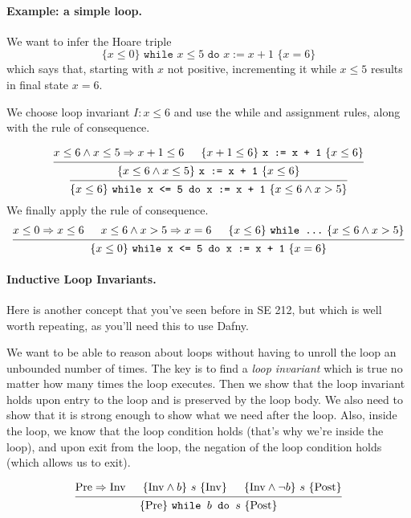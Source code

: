 \documentclass[11pt]{article}
\begin{document}
\paragraph{Example: a simple loop.}
We want to infer the Hoare triple
\[ \{ x \leq 0 \} \texttt{~while $x \leq 5$ do $x := x + 1$~}  \{ x=6\} \]
which says that, starting with $x$ not positive, incrementing it while $x \leq 5$ results in final state $x = 6$.

We choose loop invariant $I: x \leq 6$ and use the while and assignment rules, along with the rule of consequence.

\[
\begin{prooftree}
  \hypo{x \leq 6 \wedge x \leq 5 \Rightarrow x + 1 \leq 6}
  \hypo{\{ x+1 \leq 6 \} ~\texttt{x := x + 1}~ \{ x \leq 6 \}}
  \infer2{\{ x \leq 6 \wedge x \leq 5\} ~\texttt{x := x + 1}~ \{ x \leq 6 \}}
  \infer1{\{ x \leq 6\} ~\texttt{while x <= 5 do x := x + 1}~ \{ x \leq 6 \wedge x > 5 \}}
\end{prooftree}
\]
We finally apply the rule of consequence.
\[
\begin{prooftree}
  \hypo{x \leq 0 \Rightarrow x \leq 6}
  \hypo{x \leq 6 \wedge x > 5 \Rightarrow x = 6}
  \hypo{\{x \leq 6\} ~\texttt{while \ldots}~ \{ x \leq 6 \wedge x > 5\} }
  \infer3{\{x \leq 0\} ~\texttt{while x <= 5 do x := x + 1}~\{ x = 6 \}}
\end{prooftree}
\]

\paragraph{Inductive Loop Invariants.} Here is another concept that you've seen before in SE 212, but which is
well worth repeating, as you'll need this to use Dafny.

We want to be able to reason about loops without having to unroll the loop an unbounded number of times.
The key is to find a \emph{loop invariant} which is true no matter how many times the loop executes.
Then we show that the loop invariant holds upon entry to the loop and is preserved by the loop body.
We also need to show that it is strong enough to show what we need after the loop. Also, inside the loop,
we know that the loop condition holds (that's why we're inside the loop), and upon exit from the loop,
the negation of the loop condition holds (which allows us to exit).

\[
\begin{prooftree}
  \hypo{\mathrm{Pre} \Rightarrow \mathrm{Inv}}
  \hypo{\{ \mathrm{Inv} \wedge b \} ~s~ \{ \mathrm{Inv} \}}
  \hypo{\{ \mathrm{Inv} \wedge \neg b \} ~s~ \{ \mathrm{Post} \}}
  \infer3{\{ \mathrm{Pre} \} ~\texttt{while $b$ do $s$}~ \{ \mathrm{Post} \}}
\end{prooftree}
\]
\end{document}
